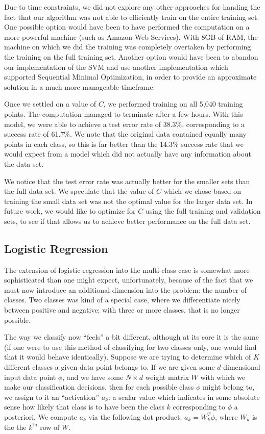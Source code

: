 \documentclass{sigchi}
\begin{document}
Due to time constraints, we did not explore any other approaches for handing the fact that our algorithm was not able to efficiently train on the entire training set. One possible option would have been to have performed the computation on a more powerful machine (such as Amazon Web Services). With 8GB of RAM, the machine on which we did the training was completely overtaken by performing the training on the full training set. Another option would have been to abandon our implementation of the SVM and use another implementation which supported Sequential Minimal Optimization, in order to provide an approximate solution in a much more manageable timeframe.

Once we settled on a value of $C$, we performed training on all 5,040 training points. The computation managed to terminate after a few hours. With this model, we were able to achieve a test error rate of 38.3\%, corresponding to a success rate of 61.7\%. We note that the original data contained equally many points in each class, so this is far better than the 14.3\% success rate that we would expect from a model which did not actually have any information about the data set.

We notice that the test error rate was actually better for the smaller sets than the full data set. We speculate that the value of $C$ which we chose based on training the small data set was not the optimal value for the larger data set. In future work, we would like to optimize for $C$ using the full training and validation sets, to see if that allows us to achieve better performance on the full data set.

\subsection{Logistic Regression}

The extension of logistic regression into the multi-class case is somewhat more sophisticated than one might expect, unfortunately, because of the fact that we must now introduce an additional dimension into the problem: the number of classes. Two classes was kind of a special case, where we differentiate nicely between positive and negative; with three or more classes, that is no longer possible. 

The way we classify now ``feels'' a bit different, although at its core it is the same (if one were to use this method of classifying for two classes only, one would find that it would behave identically). Suppose we are trying to determine which of $K$ different classes a given data point belongs to. If we are given some $d$-dimensional input data point $\phi$, and we have some $N \times d$ weight matrix $W$ with which we make our classification decisions, then for each possible class $\phi$ might belong to, we assign to it an ``activation'' $a_k$: a scalar value which indicates in some absolute sense how likely that class is to have been the class $k$ corresponding to $\phi$ a posteriori. We compute $a_k$ via the following dot product: $a_k = W_k^T\phi$, where $W_k$ is the the $k^{\textrm{th}}$ row of $W$.
\end{document}
